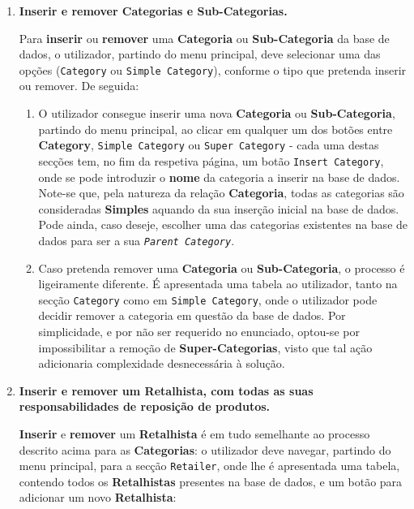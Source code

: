 \documentclass[12pt,a4paper]{article}
\begin{document}
  \begin{enumerate}
    \item \textbf{Inserir e remover Categorias e Sub-Categorias.}
    
    Para \textbf{inserir} ou \textbf{remover} uma \textbf{Categoria} ou \textbf{Sub-Categoria}
    da base de dados, o utilizador, partindo do menu principal, deve selecionar
    uma das opções (\texttt{Category} ou \texttt{Simple Category}), conforme o tipo
    que pretenda inserir ou remover. De seguida:

    \begin{enumerate}
      \item O utilizador consegue inserir uma nova \textbf{Categoria} ou \textbf{Sub-Categoria}, partindo
      do menu principal, ao clicar em qualquer um dos botões entre \textbf{Category},
      \texttt{Simple Category} ou \texttt{Super Category} - cada uma destas secções
      tem, no fim da respetiva página, um botão \texttt{Insert Category}, onde se pode
      introduzir o \textbf{nome} da categoria a inserir na base de dados. Note-se que,
      pela natureza da relação \textbf{Categoria}, todas as categorias são consideradas
      \textbf{Simples} aquando da sua inserção inicial na base de dados. Pode ainda, caso deseje,
      escolher uma das categorias existentes na base de dados para ser a sua
      \textit{\texttt{Parent Category}}.

      \item Caso pretenda remover uma \textbf{Categoria} ou \textbf{Sub-Categoria},
      o processo é ligeiramente diferente. É apresentada uma tabela ao utilizador,
      tanto na secção \texttt{Category} como em \texttt{Simple Category}, onde o utilizador
      pode decidir remover a categoria em questão da base de dados. Por simplicidade, e por não ser
      requerido no enunciado, optou-se por impossibilitar a remoção de \textbf{Super-Categorias},
      visto que tal ação adicionaria complexidade desnecessária à solução.
    \end{enumerate}
    
    \item \textbf{Inserir e remover um Retalhista, com todas as suas responsabilidades
    de reposição de produtos.}
    
    \textbf{Inserir} e \textbf{remover} um \textbf{Retalhista} é em tudo semelhante ao processo
    descrito acima para as \textbf{Categorias}: o utilizador deve navegar,
    partindo do menu principal, para a secção \texttt{Retailer}, onde lhe é
    apresentada uma tabela, contendo todos os \textbf{Retalhistas} presentes na
    base de dados, e um botão para adicionar um novo \textbf{Retalhista}:


\end{enumerate}
\end{document}
